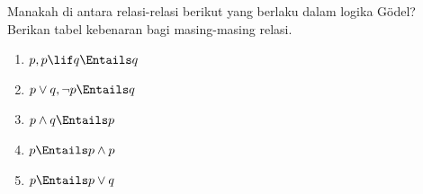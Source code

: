 \documentclass[../../../include/open-logic-section]{subfiles}
\begin{document}
\begin{prob}
  Manakah di antara relasi-relasi berikut yang berlaku dalam logika G\"odel?
  Berikan tabel kebenaran bagi masing-masing relasi.
  \begin{enumerate}
    \item $p,p\lif q\Entails q$
    \item $p\lor q,\lnot p\Entails q$
    \item $p\land q\Entails p$
    \item $p\Entails p\land p$
    \item $p\Entails p\lor q$
  \end{enumerate}
\end{prob}
\end{document}
